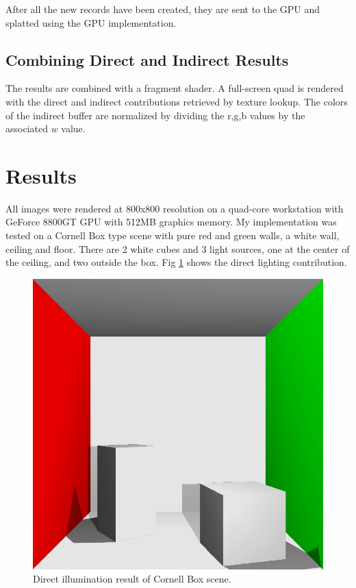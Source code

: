 \documentclass[10pt,twopage]{acmsiggraph}
\begin{document}
After all the new records have been created, they are sent to the GPU and splatted using the GPU implementation.

\subsection{Combining Direct and Indirect Results}
The results are combined with a fragment shader.  A full-screen quad is rendered with the direct and indirect contributions retrieved by texture lookup.  The colors of the indirect buffer are normalized by dividing the r,g,b values by the associated $w$ value.

\section{Results}
All images were rendered at 800x800 resolution on a quad-core workstation with GeForce 8800GT GPU with 512MB graphics memory.  My implementation was tested on a Cornell Box type scene with pure red and green walls, a white wall, ceiling and floor.  There are 2 white cubes and 3 light sources, one at the center of the ceiling, and two outside the box.  Fig \ref{direct} shows the direct lighting contribution.

\begin{figure}[htbp]
\begin{center}
\includegraphics[scale = .3]{directIllumination.png}
\caption{Direct illumination result of Cornell Box scene.}
\label{direct}
\end{center}
\end{figure}
\end{document}
